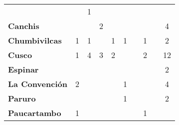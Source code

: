 \begin{tabular}{lccccccccc}
	&\cellcolor[HTML]{FCC46C} 					&1\\
	\textbf{Canchis}                            
	&\cellcolor[HTML]{FCC46C}                   &\cellcolor[HTML]{FCC46C}                   &2         &\cellcolor[HTML]{FCC46C}                	&\cellcolor[HTML]{FCC46C}              &\cellcolor[HTML]{FCC46C} 		  			&\cellcolor[HTML]{FCC46C} 
	&\cellcolor[HTML]{FCC46C}   				&4\\
	\textbf{Chumbivilcas}                      
	&1                   						&1                    						&\cellcolor[HTML]{FCC46C}                   &1                  					&1            								&\cellcolor[HTML]{FCC46C}   			    &1 
	&\cellcolor[HTML]{FCC46C}					&2\\
	\textbf{Cusco}                             
	&1                    				        &4                                          &3                    			 			&2                  
	&\cellcolor[HTML]{FCC46C}                   &\cellcolor[HTML]{FCC46C}    	 
	&2 											&\cellcolor[HTML]{FCC46C} 		 
	&12\\
	\textbf{Espinar}       					                 						   
	&\cellcolor[HTML]{FCC46C}                   &\cellcolor[HTML]{FCC46C}        &\cellcolor[HTML]{FCC46C}                   &\cellcolor[HTML]{FCC46C}                   &\cellcolor[HTML]{FCC46C}  		 &\cellcolor[HTML]{FCC46C} 
	&\cellcolor[HTML]{FCC46C} 					&\cellcolor[HTML]{FCC46C} 		 
	&2\\
	\textbf{La Convención}                                                   			&2                     					    &\cellcolor[HTML]{FCC46C}                   &\cellcolor[HTML]{FCC46C}                   &\cellcolor[HTML]{FCC46C}                   &1              							&\cellcolor[HTML]{FCC46C} 					&\cellcolor[HTML]{FCC46C}
	&\cellcolor[HTML]{FCC46C}  					&4 \\
	\textbf{Paruro}                            
	&\cellcolor[HTML]{FCC46C}       	 		&\cellcolor[HTML]{FCC46C}              	    &\cellcolor[HTML]{FCC46C}                   &\cellcolor[HTML]{FCC46C}              	    
	&1        
	&\cellcolor[HTML]{FCC46C}                   &\cellcolor[HTML]{FCC46C}   				
	&\cellcolor[HTML]{FCC46C} 					&2      \\
	\textbf{Paucartambo}               		   
	&1                      
	&\cellcolor[HTML]{FCC46C}                   &\cellcolor[HTML]{FCC46C}       &\cellcolor[HTML]{FCC46C}                      
	&\cellcolor[HTML]{FCC46C}                   & \cellcolor[HTML]{FCC46C} 		 &1
	&\cellcolor[HTML]{FCC46C} 					&\cellcolor[HTML]{FCC46C}\\

\end{tabular}
